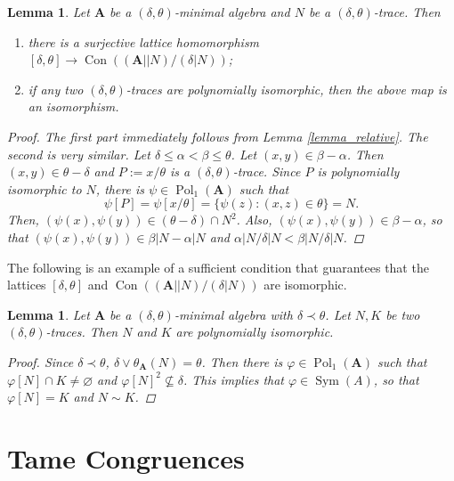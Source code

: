 \documentclass{amsart}
\theoremstyle{plain}
\newtheorem{lemma}[theorem]{Lemma}
\theoremstyle{definition}
\theoremstyle{remark}
\def\phi{\varphi}
\DeclareMathOperator{\Con}{Con}
\DeclareMathOperator{\Pol}{Pol}
\DeclareMathOperator{\Sym}{Sym}
\begin{document}
\begin{lemma}
    Let $\mathbf{A}$ be a $(\delta, \theta)$-minimal algebra and $N$ be a $(\delta, \theta)$-trace. 
    Then 
    \begin{enumerate}
        \item there is a surjective lattice homomorphism $[\delta, \theta] \to \Con((\mathbf{A}||N)/(\delta|N))$; 
        \item if any two $(\delta, \theta)$-traces are polynomially isomorphic, then the above map is an isomorphism. 
    \end{enumerate}
    \begin{proof}
        The first part immediately follows from Lemma \ref{lemma_relative}.
        The second is very similar.
        Let $\delta \le \alpha < \beta \le \theta$. 
        Let $(x,y) \in \beta - \alpha$. 
        Then $(x,y) \in \theta - \delta$ and $P:=x/\theta$ is a $(\delta, \theta)$-trace. 
        Since $P$ is polynomially isomorphic to $N$, there is $\psi \in \Pol_1(\mathbf{A})$ such that 
        \begin{equation*}
            \psi[P] = \psi[x/\theta] =\{\psi(z): (x,z) \in \theta\}= N \text{.}
        \end{equation*}
        Then, $(\psi(x),\psi(y)) \in (\theta - \delta) \cap N^2$.
        Also, $(\psi(x),\psi(y)) \in \beta - \alpha$, so that $(\psi(x),\psi(y)) \in \beta|N - \alpha|N$ and $\alpha|N/\delta|N < \beta|N/\delta|N$. 
    \end{proof}
\end{lemma}

The following is an example of a sufficient condition that guarantees that the lattices $[\delta, \theta]$ and $\Con((\mathbf{A}||N)/(\delta|N))$ are isomorphic. 

\begin{lemma}
    Let $\mathbf{A}$ be a $(\delta, \theta)$-minimal algebra with $\delta \prec \theta$. 
    Let $N,K$ be two $(\delta, \theta)$-traces. 
    Then $N$ and $K$ are polynomially isomorphic. 
    \begin{proof}
        Since $\delta \prec \theta$, $\delta \lor \theta_{\mathbf{A}}(N)=\theta$. 
        Then there is $\phi \in \Pol_1(\mathbf{A})$ such that $\phi[N] \cap K \neq \varnothing$ and $\phi[N]^2 \nsubseteq \delta$.
        This implies that $\phi \in \Sym(A)$, so that $\phi[N]=K$ and $N \sim K$.  
    \end{proof}
\end{lemma}

\section{Tame Congruences}
\end{document}
